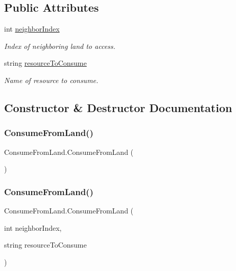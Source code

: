 \subsection*{Public Attributes}
\begin{DoxyCompactItemize}
\item 
int \mbox{\hyperlink{class_consume_from_land_a645ca79e901a05c787df9e35d3a0318b}{neighbor\+Index}}
\begin{DoxyCompactList}\small\item\em Index of neighboring land to access. \end{DoxyCompactList}\item 
string \mbox{\hyperlink{class_consume_from_land_a4ef240b29ec3b427fca36c8de1fed24b}{resource\+To\+Consume}}
\begin{DoxyCompactList}\small\item\em Name of resource to consume. \end{DoxyCompactList}\end{DoxyCompactItemize}


\subsection{Constructor \& Destructor Documentation}
\mbox{\label{class_consume_from_land_a5496a937e22a90235f5df516af9cd133}} 
\subsubsection{\texorpdfstring{Consume\+From\+Land()}{ConsumeFromLand()}\hspace{0.1cm}{\footnotesize\ttfamily [1/2]}}
{\footnotesize\ttfamily Consume\+From\+Land.\+Consume\+From\+Land (\begin{DoxyParamCaption}{ }\end{DoxyParamCaption})}

\mbox{\label{class_consume_from_land_a7168ad8a66c20529d60930de930bfafe}} 
\subsubsection{\texorpdfstring{Consume\+From\+Land()}{ConsumeFromLand()}\hspace{0.1cm}{\footnotesize\ttfamily [2/2]}}
{\footnotesize\ttfamily Consume\+From\+Land.\+Consume\+From\+Land (\begin{DoxyParamCaption}\item[{int}]{neighbor\+Index,  }\item[{string}]{resource\+To\+Consume }\end{DoxyParamCaption})}



